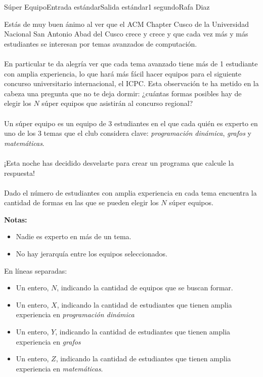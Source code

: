 \begin{problem}{Súper Equipo}{Entrada estándar}{Salida estándar}{1 segundo}{}{Rafa Diaz}

Estás de muy buen ánimo al ver que el ACM Chapter Cusco de la Universidad Nacional San Antonio Abad del Cusco crece y crece y que cada vez más y más estudiantes se interesan por temas avanzados de computación.
\\\\
En particular te da alegría ver que cada tema avanzado tiene más de 1 estudiante con amplia experiencia, lo que hará más fácil hacer equipos para el siguiente concurso universitario internacional, el ICPC. Esta observación te ha metido en la cabeza una pregunta que no te deja dormir: ¿cuántas formas posibles hay de elegir los $N$ súper equipos que asistirán al concurso regional?
\\\\
Un súper equipo es un equipo de 3 estudiantes en el que cada quién es experto en uno de los 3 temas que el club considera clave: \emph{programación dinámica}, \emph{grafos} y \emph{matemáticas}.
\\\\
¡Esta noche has decidido desvelarte para crear un programa que calcule la respuesta!
\\\\
Dado el número de estudiantes con amplia experiencia en cada tema encuentra la cantidad de formas en las que se pueden elegir los $N$ súper equipos.

\textbf{Notas:}
\begin{itemize}
    \item Nadie es experto en más de un tema.
    \item No hay jerarquía entre los equipos seleccionados.
\end{itemize}



\InputFile

En líneas separadas:
\begin{itemize}
    \item Un entero, $N$, indicando la cantidad de equipos que se buscan formar.
    \item Un entero, $X$, indicando la cantidad de estudiantes que tienen amplia experiencia en \emph{programación dinámica}
    \item Un entero, $Y$, indicando la cantidad de estudiantes que tienen amplia experiencia en \emph{grafos}
    \item Un entero, $Z$, indicando la cantidad de estudiantes que tienen amplia experiencia en \emph{matemáticas}.
\end{itemize}


\end{problem}

